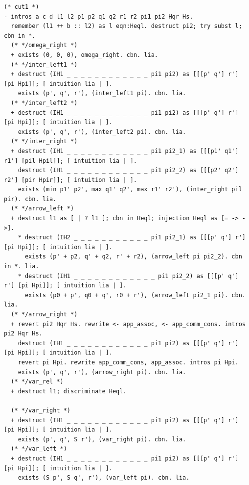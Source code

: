 \begin{lstlisting}
(* cut1 *)
- intros a c d l1 l2 p1 p2 q1 q2 r1 r2 pi1 pi2 Hqr Hs.
  remember (l1 ++ b :: l2) as l eqn:Heql. destruct pi2; try subst l; cbn in *.
  (* */omega_right *)
  + exists (0, 0, 0), omega_right. cbn. lia.
  (* */inter_left1 *)
  + destruct (IH1 _ _ _ _ _ _ _ _ _ _ _ _ pi1 pi2) as [[[p' q'] r'] [pi Hpi]]; [ intuition lia | ].
    exists (p', q', r'), (inter_left1 pi). cbn. lia.
  (* */inter_left2 *)
  + destruct (IH1 _ _ _ _ _ _ _ _ _ _ _ _ pi1 pi2) as [[[p' q'] r'] [pi Hpi]]; [ intuition lia | ].
    exists (p', q', r'), (inter_left2 pi). cbn. lia.
  (* */inter_right *)
  + destruct (IH1 _ _ _ _ _ _ _ _ _ _ _ _ pi1 pi2_1) as [[[p1' q1'] r1'] [pil Hpil]]; [ intuition lia | ].
    destruct (IH1 _ _ _ _ _ _ _ _ _ _ _ _ pi1 pi2_2) as [[[p2' q2'] r2'] [pir Hpir]]; [ intuition lia | ].
    exists (min p1' p2', max q1' q2', max r1' r2'), (inter_right pil pir). cbn. lia.
  (* */arrow_left *)
  + destruct l1 as [ | ? l1 ]; cbn in Heql; injection Heql as [= -> ->].
    * destruct (IH2 _ _ _ _ _ _ _ _ _ _ _ pi1 pi2_1) as [[[p' q'] r'] [pi Hpi]]; [ intuition lia | ].
      exists (p' + p2, q' + q2, r' + r2), (arrow_left pi pi2_2). cbn in *. lia.
    * destruct (IH1 _ _ _ _ _ _ _ _ _ _ _ _ pi1 pi2_2) as [[[p' q'] r'] [pi Hpi]]; [ intuition lia | ].
      exists (p0 + p', q0 + q', r0 + r'), (arrow_left pi2_1 pi). cbn. lia.
  (* */arrow_right *)
  + revert pi2 Hqr Hs. rewrite <- app_assoc, <- app_comm_cons. intros pi2 Hqr Hs.
    destruct (IH1 _ _ _ _ _ _ _ _ _ _ _ _ pi1 pi2) as [[[p' q'] r'] [pi Hpi]]; [ intuition lia | ].
    revert pi Hpi. rewrite app_comm_cons, app_assoc. intros pi Hpi.
    exists (p', q', r'), (arrow_right pi). cbn. lia.
  (* */var_rel *)
  + destruct l1; discriminate Heql.

  (* */var_right *)
  + destruct (IH1 _ _ _ _ _ _ _ _ _ _ _ _ pi1 pi2) as [[[p' q'] r'] [pi Hpi]]; [ intuition lia | ].
    exists (p', q', S r'), (var_right pi). cbn. lia.
  (* */var_left *)
  + destruct (IH1 _ _ _ _ _ _ _ _ _ _ _ _ pi1 pi2) as [[[p' q'] r'] [pi Hpi]]; [ intuition lia | ].
    exists (S p', S q', r'), (var_left pi). cbn. lia.


\end{lstlisting}
